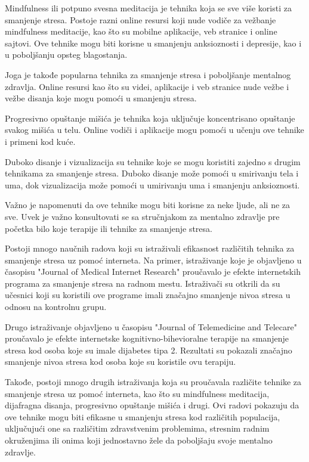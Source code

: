 \documentclass[a4paper]{article}
\begin{document}
Mindfulness ili potpuno svesna meditacija je tehnika koja se sve više koristi za smanjenje stresa. Postoje razni online resursi koji nude vodiče za vežbanje mindfulness meditacije, kao što su mobilne aplikacije, veb stranice i online sajtovi. Ove tehnike mogu biti korisne u smanjenju anksioznosti i depresije, kao i u poboljšanju opsteg blagostanja.

Joga je takođe popularna tehnika za smanjenje stresa i poboljšanje mentalnog zdravlja. Online resursi kao što su videi, aplikacije i veb stranice nude vežbe i vežbe disanja koje mogu pomoći u smanjenju stresa.

Progresivno opuštanje mišića je tehnika koja uključuje koncentrisano opuštanje svakog mišića u telu. Online vodiči i aplikacije mogu pomoći u učenju ove tehnike i primeni kod kuće.

Duboko disanje i vizualizacija su tehnike koje se mogu koristiti zajedno s drugim tehnikama za smanjenje stresa. Duboko disanje može pomoći u smirivanju tela i uma, dok vizualizacija može pomoći u umirivanju uma i smanjenju anksioznosti.

Važno je napomenuti da ove tehnike mogu biti korisne za neke ljude, ali ne za sve. Uvek je važno konsultovati se sa stručnjakom za mentalno zdravlje pre početka bilo koje terapije ili tehnike za smanjenje stresa.

Postoji mnogo naučnih radova koji su istraživali efikasnost različitih tehnika za smanjenje stresa uz pomoć interneta. Na primer, istraživanje koje je objavljeno u časopisu "Journal of Medical Internet Research"\cite{cetrnaest} proučavalo je efekte internetskih programa za smanjenje stresa na radnom mestu. Istraživači su otkrili da su učesnici koji su koristili ove programe imali značajno smanjenje nivoa stresa u odnosu na kontrolnu grupu.

Drugo istraživanje objavljeno u časopisu "Journal of Telemedicine and Telecare"\cite{petnaest}   proučavalo je efekte internetske kognitivno-bihevioralne terapije na smanjenje stresa kod osoba koje su imale dijabetes tipa 2. Rezultati su pokazali značajno smanjenje nivoa stresa kod osoba koje su koristile ovu terapiju.

Takođe, postoji mnogo drugih istraživanja koja su proučavala različite tehnike za smanjenje stresa uz pomoć interneta, kao što su mindfulness meditacija, dijafragna disanja, progresivno opuštanje mišića i drugi. Ovi radovi pokazuju da ove tehnike mogu biti efikasne u smanjenju stresa kod različitih populacija, uključujući one sa različitim zdravstvenim problemima, stresnim radnim okruženjima ili onima koji jednostavno žele da poboljšaju svoje mentalno zdravlje.
\end{document}

